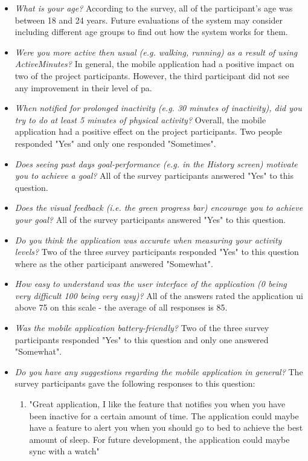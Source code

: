 \begin{itemize}
    \item \textit{What is your age?}
    According to the survey, all of the participant's age was between 18 and 24 years. Future evaluations of the system may consider including different age groups to find out how the system works for them.
    \item \textit{Were you more active then usual (e.g. walking, running) as a result of using ActiveMinutes?}
    In general, the mobile application had a positive impact on two of the project participants. However, the third participant did not see any improvement in their level of \gls{pa}. 
    \item \textit{When notified for prolonged inactivity (e.g. 30 minutes of inactivity), did you try to do at least 5 minutes of physical activity?}
    Overall, the mobile application had a positive effect on the project participants. Two people responded "Yes" and only one responded "Sometimes". 
    \item \textit{Does seeing past days goal-performance (e.g. in the History screen) motivate you to achieve a goal?}
    All of the survey participants answered "Yes" to this question.
    \item \textit{Does the visual feedback (i.e. the green progress bar) encourage you to achieve your goal?}
    All of the survey participants answered "Yes" to this question.
    \item \textit{Do you think the application was accurate when measuring your activity levels?}
    Two of the three survey participants responded "Yes" to this question where as the other participant answered "Somewhat".
    \item \textit{How easy to understand was the user interface of the application (0 being very difficult 100 being very easy)?} All of the answers rated the application \gls{ui} above 75 on this scale - the average of all responses is 85.
    \item \textit{Was the mobile application battery-friendly?}  Two of the three survey participants responded "Yes" to this question and only one answered "Somewhat".
    \item \textit{Do you have any suggestions regarding the mobile application in general?} The survey participants gave the following responses to this question: 
    \begin{enumerate}
        \item "Great application, I like the feature that notifies you when you have been inactive for a certain amount of time. The application could maybe have a feature to alert you when you should go to bed to achieve the best amount of sleep. For future development, the application could maybe sync with a watch"

\end{enumerate}
\end{itemize}
